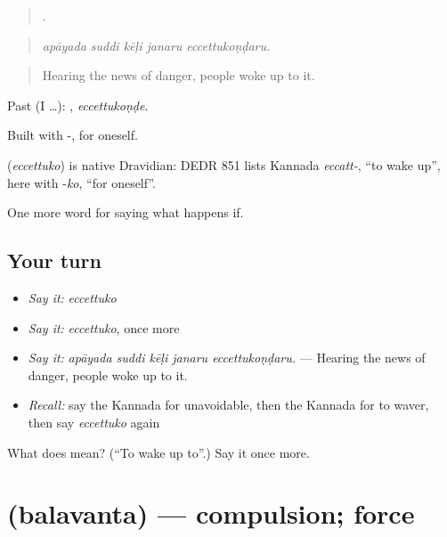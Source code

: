 \begin{quote}
    .
\end{quote}

\begin{quote}
\emph{apāyada suddi kēḷi janaru eccettukoṇḍaru.}
\end{quote}

\begin{quote}
Hearing the news of danger, people woke up to it.
\end{quote}

Past (I …): , \emph{eccettukoṇḍe}.

Built with -, for oneself.

\begin{cousinweb}
\textbf{} (\emph{eccettuko}) is native Dravidian: DEDR 851 lists Kannada \emph{eccatt-}, \textquotedblleft{}to wake up\textquotedblright{}, here with -\emph{ko}, \textquotedblleft{}for oneself\textquotedblright{}.
\end{cousinweb}

\begin{grammarlens}[title={What you've built}]
One more word for saying what happens if.
\end{grammarlens}

\subsection*{Your turn}
\begin{itemize}
\raggedright
  \item \emph{Say it:} \emph{eccettuko}
  \item \emph{Say it:} \emph{eccettuko}, once more
  \item \emph{Say it:} \emph{apāyada suddi kēḷi janaru eccettukoṇḍaru.} — Hearing the news of danger, people woke up to it.
  \item \emph{Recall:} say the Kannada for unavoidable, then the Kannada for to waver, then say \emph{eccettuko} again
\end{itemize}

\begin{tcolorbox}[breakable,colback=teal!4,colframe=teal!35!black,title={Before you move on}]
What does  mean? (\textquotedblleft{}To wake up to\textquotedblright{}.) Say it once more.
\end{tcolorbox}
\section[\texorpdfstring{\kn{ಬಲವಂತ} (balavanta)}{ಬಲವಂತ (balavanta)}]{ (balavanta) — compulsion; force}

